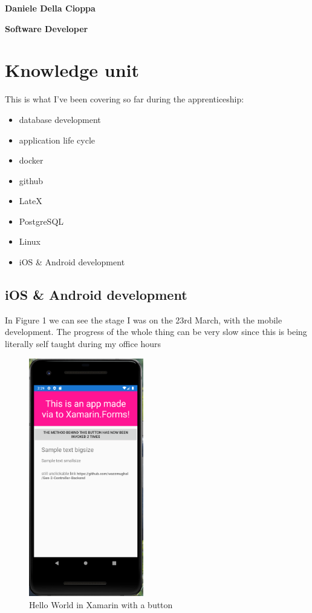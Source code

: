 \documentclass[a4paper,12pt]{article}
\begin{document}
\textbf{Daniele Della Cioppa}

\textbf{Software Developer}

\tableofcontents
\clearpage

\section{Knowledge unit}

This is what I've been covering so far during the apprenticeship:

\begin{itemize}
\item {database development}
\item {application life cycle}
\item docker
\item github 
\item LateX
\item PostgreSQL
\item Linux
\item {iOS \& Android development}
\end{itemize}
\clearpage

\subsection{iOS \& Android development}
In Figure 1 we can see the stage I was on the 23rd March, with the mobile development. The progress of the whole thing can be very slow since this is being literally self taught during my office hours \newline

\begin{figure}
\centering
\includegraphics[width=5cm]{./capture-app.PNG}
\caption{Hello World in Xamarin with a button\footnotemark{}}\label{wrap-fig:1}
\end{figure} 
\end{document}
